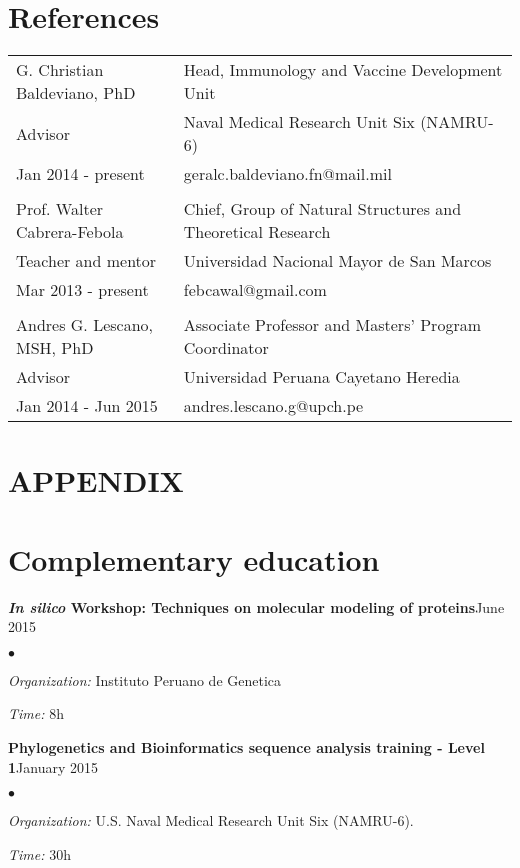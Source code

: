 \documentclass[margin,line]{res}
\newenvironment{list2}{
  \begin{list}{$\bullet$}{%
      \setlength{\itemsep}{0in}
      \setlength{\parsep}{0in} \setlength{\parskip}{0in}
      \setlength{\topsep}{0in} \setlength{\partopsep}{0in}
      \setlength{\leftmargin}{0.2in}}}{\end{list}}
\begin{document}
\begin{resume}
\section{\sc References }

\begin{tabular}{ l l }
	G. Christian Baldeviano, PhD & Head, Immunology and Vaccine Development Unit \\
	Advisor & Naval Medical Research Unit Six (NAMRU-6)\\
	Jan 2014 - present & geralc.baldeviano.fn@mail.mil\\
	&\\
	Prof. Walter Cabrera-Febola & Chief, Group of Natural Structures and Theoretical Research \\
	Teacher and mentor & Universidad Nacional Mayor de San Marcos\\
	Mar 2013 - present & febcawal@gmail.com\\
	&\\
	Andres G. Lescano, MSH, PhD & Associate Professor and Masters' Program Coordinator\\
	Advisor & Universidad Peruana Cayetano Heredia\\
	Jan 2014 - Jun 2015 & andres.lescano.g@upch.pe\\
\end{tabular}

\newpage

\section{\scshape APPENDIX}

\section{\sc Complementary education}

{\bf \textit{In silico} Workshop: Techniques on molecular modeling of proteins}\hfill {June 2015}\\
\vspace*{-.1in}
\begin{list2} %
	\item \textit{Organization:} Instituto Peruano de Genetica
	\item \textit{Time:} 8h
\end{list2}

{\bf Phylogenetics and Bioinformatics sequence analysis training - Level 1}\hfill {January 2015}\\
\vspace*{-.1in}
\begin{list2} %
	\item \textit{Organization:} U.S. Naval Medical Research Unit Six (NAMRU-6).
	\item \textit{Time:} 30h
\end{list2}


\end{resume}
\end{document}
